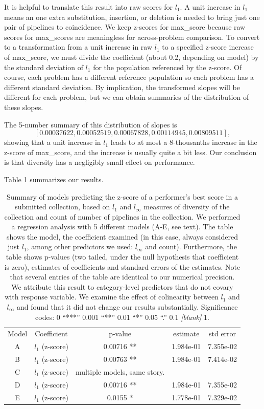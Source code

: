\documentclass{article}
\begin{document}
It is helpful to translate this result into raw scores for $l_1$.  A
unit increase in $l_1$ means an one extra substitution, insertion, or
deletion is needed to bring just one pair of pipelines to coincidence.
We keep z-scores for max\_score because raw scores for max\_scores are
meaningless for across-problem comparison.  To convert to a
transformation from a unit increase in raw $l_1$ to a specified
z-score increase of max\_score, we must divide the coefficient (about
0.2, depending on model) by the standard deviation of $l_1$ for the
population referenced by the z-score.  Of course, each problem has a
different reference population so each problem has a different
standard deviation.  By implication, the transformed slopes will be
different for each problem, but we can obtain summaries of the
distribution of these slopes.

The 5-number summary of this distribution of slopes is
$$[0.00037622, 0.00052519, 0.00067828, 0.00114945, 0.00809511],$$
showing that a unit increase in $l_1$ leads to at most a 8-thousanths
increase in the z-score of max\_score, and the increase is usually
quite a bit less.  Our conclusion is that diversity has a negligibly
small effect on performance.

Table 1 summarizes our results.

\begin{table}
  \begin{tabular}{c|c|c|c|c}
    Model & Coefficient & p-value & estimate & std error \\
    A  & $l_1$ (z-score) & 0.00716 ** & 1.984e-01 & 7.355e-02 \\
    B  & $l_1$ (z-score) & 0.00763 ** & 1.984e-01 & 7.414e-02 \\
    C  & $l_1$ (z-score) & multiple models, same story. & & \\
    D  & $l_1$ (z-score) & 0.00716 ** & 1.984e-01 & 7.355e-02 \\
    E  & $l_1$ (z-score) & 0.0155  *  & 1.778e-01 & 7.329e-02 \\
  \end{tabular}
  \caption{Summary of models predicting the z-score of a performer's
    best score in a submitted collection, based on $l_1$ and
    $l_\infty$ measures of diversity of the collection and count of
    number of pipelines in the collection.  We performed a regression
    analysis with 5 different models (A-E, see text).  The table
    shows the model, the coefficient examined (in this case, always
    considered just $l_1$, among other predictors we used: $l_\infty$
    and count).  Furthermore, the table shows p-values (two tailed,
    under the null hypothesis that coefficient is zero), estimates of
    coefficients and standard errors of the estimates.  Note that
    several entries of the table are identical to our numerical
    precision.  We attribute this result to category-level predictors
    that do not covary with response variable.  We examine the effect
    of colinearity between $l_1$ and $l_\infty$ and found that it did
    not change our results substantially. Significance codes: 0
    ``***'' 0.001 ``**'' 0.01 ``*'' 0.05 ``.''  0.1 \emph{[blank]} 1.}
\end{table}
\end{document}
